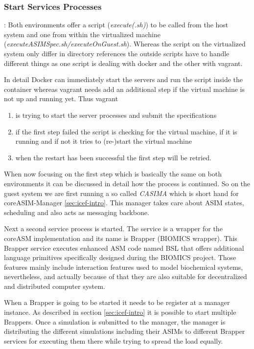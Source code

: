 \subsubsection{Start Services Processes}: Both environments offer a script (\textit{execute(.sh)}) to be called from the host system and one from within the virtualized machine (\textit{executeASIMSpec.sh/executeOnGuest.sh}). Whereas the script on the virtualized system only differ in directory references the outside scripts have to handle different things as one script is dealing with docker and the other with vagrant.

In detail Docker can immediately start the servers and run the script inside the container whereas vagrant needs add an additional step if the virtual machine is not up and running yet. Thus vagrant

\begin{enumerate}
	\item is trying to start the server processes and submit the specifications
	\item if the first step failed the script is checking for the virtual machine, if it is running and if not it tries to (re-)start the virtual machine
	\item when the restart has been successful the first step will be retried.
\end{enumerate}

When now focusing on the first step which is basically the same on both environments it can be discussed in detail how the process is continued. So on the guest system we are first running a so called \textit{CASIMA} which is short hand for coreASIM-Manager \ref{sec:icef-intro}. This manager takes care about ASIM states, scheduling and also acts as messaging backbone.

Next a second service process is started. The service is a wrapper for the coreASM implementation and its name is Brapper (BIOMICS wrapper). This Brapper service executes enhanced ASM code named BSL that offers additional language primitives specifically designed during the BIOMICS project. Those features mainly include interaction features used to model biochemical systems, nevertheless, and actually because of that they are also suitable for decentralized and distributed computer system.

When a Brapper is going to be started it needs to be register at a manager instance. As described in section \ref{sec:icef-intro} it is possible to start multiple Brappers. Once a simulation is submitted to the manager, the manager is distributing the different simulations including their ASIMs to different Brapper services for executing them there while trying to spread the load equally.

